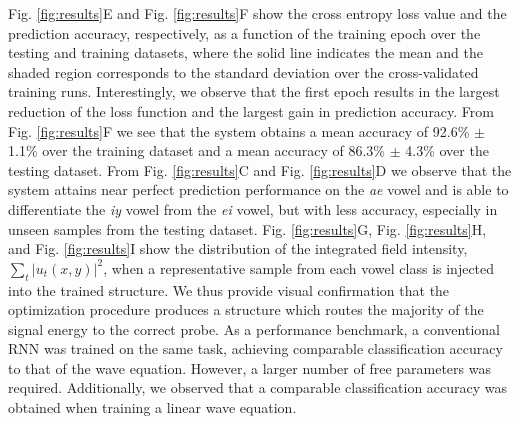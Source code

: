 Fig. \ref{fig:results}E and Fig. \ref{fig:results}F show the cross entropy loss value and the prediction accuracy, respectively, as a function of the training epoch over the testing and training datasets, where the solid line indicates the mean and the shaded region corresponds to the standard deviation over the cross-validated training runs.
Interestingly, we observe that the first epoch results in the largest reduction of the loss function and the largest gain in prediction accuracy.
From Fig. \ref{fig:results}F we see that the system obtains a mean accuracy of 92.6\% $\pm$ 1.1\% over the training dataset and a mean accuracy of 86.3\% $\pm$ 4.3\% over the testing dataset.
From Fig. \ref{fig:results}C and Fig. \ref{fig:results}D we observe that the system attains near perfect prediction performance on the \textit{ae} vowel and is able to differentiate the \textit{iy} vowel from the \textit{ei} vowel, but with less accuracy, especially in unseen samples from the testing dataset. 
Fig. \ref{fig:results}G, Fig. \ref{fig:results}H, and Fig. \ref{fig:results}I show the distribution of the integrated field intensity, $\sum_t{\left\vert u_t{\left(x,y\right)} \right\vert^2}$, when a representative sample from each vowel class is injected into the trained structure. 
We thus provide visual confirmation that the optimization procedure produces a structure which routes the majority of the signal energy to the correct probe. 
As a performance benchmark, a conventional RNN was trained on the same task, achieving comparable classification accuracy to that of the wave equation. However, a larger number of free parameters was required.
Additionally, we observed that a comparable classification accuracy was obtained when training a linear wave equation.

